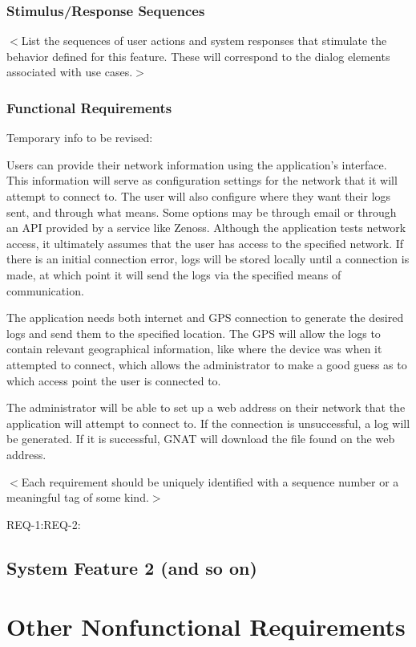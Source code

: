 \documentclass{scrreprt}
\begin{document}
\subsection{Stimulus/Response Sequences}
$<$List the sequences of user actions and system responses that stimulate the 
behavior defined for this feature. These will correspond to the dialog elements 
associated with use cases.$>$

\subsection{Functional Requirements}

Temporary info to be revised: 

Users can provide their network information using the application's interface.  This information will serve as configuration settings for the network that it will attempt to connect to. The user will also configure where they want their logs sent, and through what means. Some options may be through email or through an API provided by a service like Zenoss.  Although the application tests network access, it ultimately assumes that the user has access to the specified network.  If there is an initial connection error, logs will be stored locally until a connection is made, at which point it will send the logs via the specified means of communication.

The application needs both internet and GPS connection to generate the desired logs and send them to the specified location.  The GPS will allow the logs to contain relevant geographical information, like where the device was when it attempted to connect, which allows the administrator to make a good guess as to which access point the user is connected to.

The administrator will be able to set up a web address on their network that the application will attempt to connect to.  If the connection is unsuccessful, a log will be generated.  If it is successful, GNAT will download the file found on the web address.


$<$Each requirement should be uniquely identified with a sequence number or a 
meaningful tag of some kind.$>$

REQ-1:REQ-2:

\section{System Feature 2 (and so on)}


\chapter{Other Nonfunctional Requirements}
\end{document}
